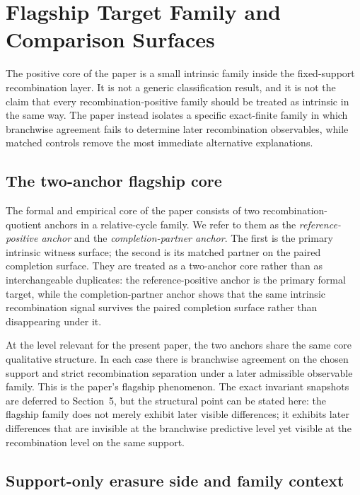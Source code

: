 \documentclass[11pt]{article}
\theoremstyle{definition}
\begin{document}
\section{Flagship Target Family and Comparison Surfaces}

The positive core of the paper is a small intrinsic family inside the fixed-support recombination layer. It is not a generic classification result, and it is not the claim that every recombination-positive family should be treated as intrinsic in the same way. The paper instead isolates a specific exact-finite family in which branchwise agreement fails to determine later recombination observables, while matched controls remove the most immediate alternative explanations.

\subsection{The two-anchor flagship core}

The formal and empirical core of the paper consists of two recombination-quotient anchors in a relative-cycle family. We refer to them as the \emph{reference-positive anchor} and the \emph{completion-partner anchor}. The first is the primary intrinsic witness surface; the second is its matched partner on the paired completion surface. They are treated as a two-anchor core rather than as interchangeable duplicates: the reference-positive anchor is the primary formal target, while the completion-partner anchor shows that the same intrinsic recombination signal survives the paired completion surface rather than disappearing under it.

At the level relevant for the present paper, the two anchors share the same core qualitative structure. In each case there is branchwise agreement on the chosen support and strict recombination separation under a later admissible observable family. This is the paper's flagship phenomenon. The exact invariant snapshots are deferred to Section~5, but the structural point can be stated here: the flagship family does not merely exhibit later visible differences; it exhibits later differences that are invisible at the branchwise predictive level yet visible at the recombination level on the same support.

\subsection{Support-only erasure side and family context}
\end{document}
